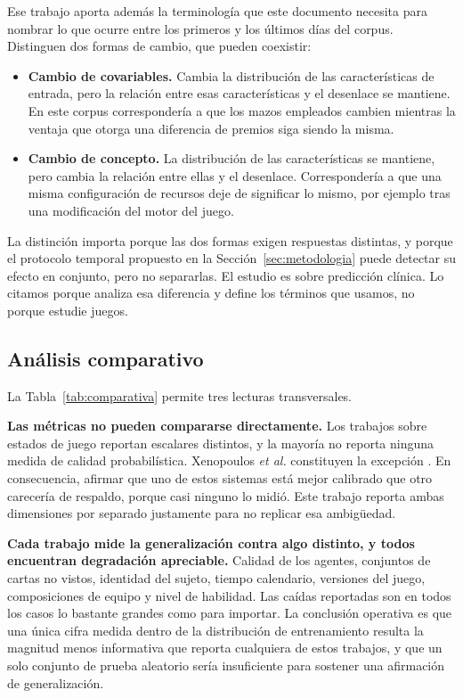 Ese trabajo aporta además la terminología que este documento necesita para
nombrar lo que ocurre entre los primeros y los últimos días del corpus.
Distinguen dos formas de cambio, que pueden coexistir:

\begin{itemize}
  \item \textbf{Cambio de covariables.} Cambia la distribución de las
        características de entrada, pero la relación entre esas
        características y el desenlace se mantiene. En este corpus
        correspondería a que los mazos empleados cambien mientras la ventaja
        que otorga una diferencia de premios siga siendo la misma.
  \item \textbf{Cambio de concepto.} La distribución de las características
        se mantiene, pero cambia la relación entre ellas y el desenlace.
        Correspondería a que una misma configuración de recursos deje de
        significar lo mismo, por ejemplo tras una modificación del motor del
        juego.
\end{itemize}

La distinción importa porque las dos formas exigen respuestas distintas, y
porque el protocolo temporal propuesto en la Sección~\ref{sec:metodologia}
puede detectar su efecto en conjunto, pero no separarlas. El estudio es sobre
predicción clínica. Lo citamos porque analiza esa diferencia y define los
términos que usamos, no porque estudie juegos.

\subsection{Análisis comparativo}
\label{subsec:comparativo}


La Tabla~\ref{tab:comparativa} permite tres lecturas transversales.

\noindent\textbf{Las métricas no pueden compararse directamente.} Los trabajos sobre
estados de juego reportan escalares distintos, y la mayoría no reporta
ninguna medida de calidad probabilística. Xenopoulos \textit{et al.}
constituyen la excepción \cite{xenopoulos_winprob_2022}. En consecuencia,
afirmar que uno de estos sistemas está mejor calibrado que otro carecería de
respaldo, porque casi ninguno lo midió. Este trabajo reporta
ambas dimensiones por separado justamente para no replicar esa ambigüedad.

\noindent\textbf{Cada trabajo mide la generalización contra algo distinto, y
todos encuentran degradación apreciable.} Calidad de los agentes, conjuntos
de cartas no vistos, identidad del sujeto, tiempo calendario, versiones del
juego, composiciones de equipo y nivel de habilidad. Las caídas reportadas
son en todos los casos lo bastante grandes como para importar. La conclusión
operativa es que una única cifra medida dentro de la distribución de
entrenamiento resulta la magnitud menos informativa que reporta cualquiera
de estos trabajos, y que un solo conjunto de prueba aleatorio sería
insuficiente para sostener una afirmación de generalización.

